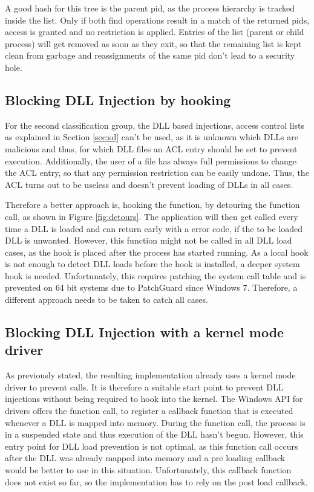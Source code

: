 A good hash for this tree is the parent pid, as the process hierarchy is tracked inside the list. Only if both find operations result in a match of the returned pids, access is granted and no restriction is applied. Entries of the list (parent or child process) will get removed as soon as they exit, so that the remaining list is kept clean from garbage and reassignments of the same pid don't lead to a security hole. 

\subsection{Blocking DLL Injection by hooking }
For the second classification group, the DLL based injections, access control lists as explained in Section \ref{sec:sd} can't be used, as it is unknown which DLLs are malicious and thus, for which DLL files an ACL entry should be set to prevent execution. Additionally, the user of a file has always full permissions to change the ACL entry, so that any permission restriction can be easily undone. Thus, the ACL turns out to be useless and doesn't prevent loading of DLLs in all cases. 

Therefore a better approach is, hooking the  function, by detouring the function call, as shown in Figure \ref{fig:detours}. The application will then get called every time a DLL is loaded and can return early with a  error code, if the to be loaded DLL is unwanted. However, this function might not be called in all DLL load cases, as the hook is placed after the process has started running. As a local hook is not enough to detect DLL loads before the hook is installed, a deeper system hook is needed. Unfortunately, this requires patching the system call table and is prevented on 64 bit systems due to PatchGuard since Windows 7. Therefore, a different approach needs to be taken to catch all cases.

\subsection{Blocking DLL Injection with a kernel mode driver}
As previously stated, the resulting implementation already uses a kernel mode driver to prevent  calls. It is therefore a suitable start point to prevent DLL injections without being required to hook into the kernel. The Windows API for drivers offers the  function call, to register a callback function that is executed whenever a DLL is mapped into memory. During the function call, the process is in a suspended state and thus execution of the DLL hasn't begun. However, this entry point for DLL load prevention is not optimal, as this function call occurs after the DLL was already mapped into memory and a pre loading callback would be better to use in this situation. Unfortunately, this callback function does not exist so far, so the implementation has to rely on the post load callback.


